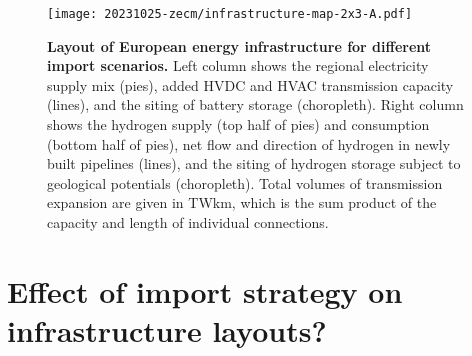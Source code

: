 \begin{figure*}
    \texttt{[image: 20231025-zecm/infrastructure-map-2x3-A.pdf]}
    \caption{\textbf{Layout of European energy infrastructure for different import scenarios.}
        Left column shows the regional electricity supply mix (pies), added HVDC and HVAC transmission capacity (lines), and the siting of battery storage (choropleth).
        Right column shows the hydrogen supply (top half of pies) and consumption (bottom half of pies), net flow and direction of hydrogen in newly built pipelines (lines), and the siting of hydrogen storage subject to geological potentials (choropleth).
        Total volumes of transmission expansion are given in TWkm, which is the sum product of the capacity and length of individual connections.
    }
    \label{fig:import-infrastructure}
\end{figure*}

\section*{Effect of import strategy on infrastructure layouts?}

